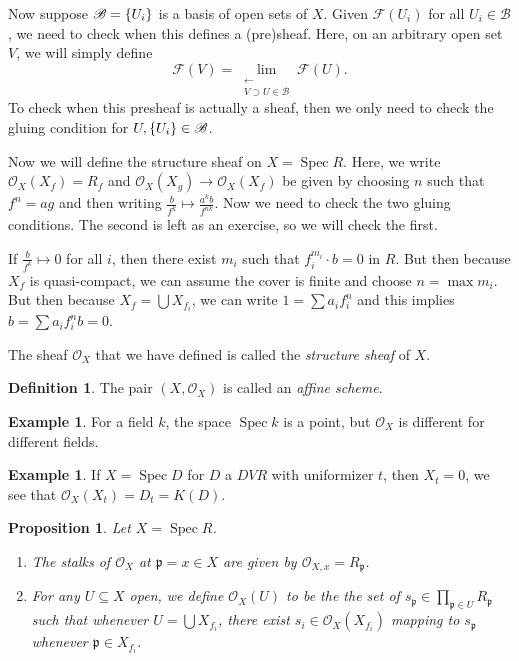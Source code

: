 \documentclass[leqno, openany]{memoir}
\newtheorem{prop}[thm]{Proposition}
\theoremstyle{definition}
\newtheorem{defn}[thm]{Definition}
\newtheorem{exm}[thm]{Example}
\theoremstyle{remark}
\theoremstyle{plain}
\theoremstyle{definition}
\theoremstyle{remark}
\newcommand{\mc}[1]{\mathcal{#1}}
\newcommand{\mf}[1]{\mathfrak{#1}}
\newcommand{\mscr}[1]{\mathscr{#1}}
\newcommand{\msc}[1]{\mathscr{#1}}
\DeclareMathOperator{\Spec}{Spec}
\begin{document}
Now suppose $\mscr{B} = \qty{U_i}$ is a basis of open sets of $X$. Given $\mc{F}(U_i)$ for all $U_i \in \mscr{B}$, we need to check when this defines a (pre)sheaf. Here, on an arbitrary open set $V$, we will simply define
\[ \mc{F}(V) = \lim_{\substack{\longleftarrow \\ V \supset U \in \mscr{B}}} \mc{F}(U). \]
To check when this presheaf is actually a sheaf, then we only need to check the gluing condition for $U, \qty{U_i} \in \mathscr{B}$.

Now we will define the structure sheaf on $X = \Spec R$. Here, we write $\msc{O}_X(X_f) = R_f$ and $\msc{O}_X(X_g) \to \msc{O}_X(X_f)$ be given by choosing $n$ such that $f^n = ag$ and then writing $\frac{b}{f^k} \mapsto \frac{a^k b}{f^{nk}}$. Now we need to check the two gluing conditions. The second is left as an exercise, so we will check the first.

If $\frac{b}{f^k} \mapsto 0$ for all $i$, then there exist $m_i$ such that $f_i^{m_i} \cdot b = 0$ in $R$. But then because $X_f$ is quasi-compact, we can assume the cover is finite and choose $n = \max m_i$. But then because $X_f = \bigcup X_{f_i}$, we can write $1 = \sum a_i f_i^n$ and this implies $b = \sum a_i f_i^n b = 0$.

The sheaf $\msc{O}_X$ that we have defined is called the \textit{structure sheaf} of $X$.

\begin{defn}
    The pair $(X, \msc{O}_X)$ is called an \textit{affine scheme}. 
\end{defn}

\begin{exm}
    For a field $k$, the space $\Spec k$ is a point, but $\msc{O}_X$ is different for different fields.
\end{exm}

\begin{exm}
    If $X = \Spec D$ for $D$ a $DVR$ with uniformizer $t$, then $X_t = \qty{0}$, we see that $\msc{O}_X(X_t) = D_t = K(D)$.
\end{exm}

\begin{prop}
    Let $X = \Spec R$. 
    \begin{enumerate}
        \item The stalks of $\msc{O}_X$ at $\mf{p} = x \in X$ are given by $\msc{O}_{X,x} = R_{\mf{p}}$.
        \item For any $U \subseteq X$ open, we define $\msc{O}_X(U)$ to be the the set of $s_{\mf{p}} \in \prod_{\mf{p} \in U} R_{\mf{p}}$ such that whenever $U = \bigcup X_{f_i}$, there exist $s_i \in \msc{O}_X(X_{f_i})$ mapping to $s_{\mf{p}}$ whenever $\mf{p} \in X_{f_i}$.
    \end{enumerate}
\end{prop}
\end{document}
